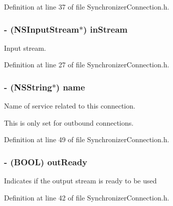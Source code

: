 Definition at line 37 of file SynchronizerConnection.h.

\hypertarget{interface_synchronizer_connection_a6518f57e11a87d0fa1592f43e6c09ef6}{
\subsubsection[{inStream}]{\setlength{\rightskip}{0pt plus 5cm}-\/ (NSInputStream$\ast$) inStream}}
\label{interface_synchronizer_connection_a6518f57e11a87d0fa1592f43e6c09ef6}
Input stream. 

Definition at line 27 of file SynchronizerConnection.h.

\hypertarget{interface_synchronizer_connection_a4b93d352d2fca75b34e1b5a50e03f587}{
\subsubsection[{name}]{\setlength{\rightskip}{0pt plus 5cm}-\/ (NSString$\ast$) name}}
\label{interface_synchronizer_connection_a4b93d352d2fca75b34e1b5a50e03f587}
Name of service related to this connection.

This is only set for outbound connections. 

Definition at line 49 of file SynchronizerConnection.h.

\hypertarget{interface_synchronizer_connection_a64d91b9747d4876f20415079bb9d9f7f}{
\subsubsection[{outReady}]{\setlength{\rightskip}{0pt plus 5cm}-\/ (BOOL) outReady}}
\label{interface_synchronizer_connection_a64d91b9747d4876f20415079bb9d9f7f}
Indicates if the output stream is ready to be used 

Definition at line 42 of file SynchronizerConnection.h.

